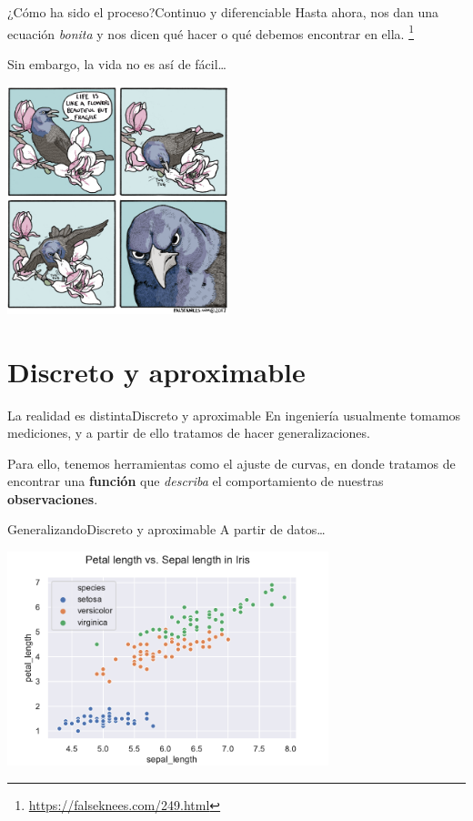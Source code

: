 \documentclass[spanish, c, dvipsnames]{beamer}
\newcommand\blfootnote[1]{%
\begingroup
\renewcommand\thefootnote{}\footnote{#1}%
\addtocounter{footnote}{-1}%
\endgroup
}
\begin{document}
\begin{frame}{¿Cómo ha sido el proceso?}{Continuo y diferenciable}
    Hasta ahora, nos dan una ecuación \textit{bonita} y nos dicen qué hacer o qué debemos encontrar en ella. \blfootnote{\url{https://falseknees.com/249.html}}
    Sin embargo, la vida no es así de fácil\dots
    \begin{center}
        \includegraphics[width=0.48\textwidth]{beautifulbutfragile.png}
    \end{center}

\end{frame}

\section{Discreto y aproximable}

\begin{frame}{La realidad es distinta}{Discreto y aproximable}
    En ingeniería usualmente tomamos mediciones, y a partir de ello tratamos de hacer generalizaciones. \pause

    \bigskip

    Para ello, tenemos herramientas como el \alert{ajuste de curvas}, en donde tratamos de encontrar una \textbf{función} que \textit{describa} el comportamiento de nuestras \textbf{observaciones}.
\end{frame}

\begin{frame}{Generalizando}{Discreto y aproximable}
    A partir de datos\dots

    \begin{center}
        \includegraphics[width=0.7\textwidth]{scatter.pdf}
    \end{center}
    

\end{frame}
\end{document}

